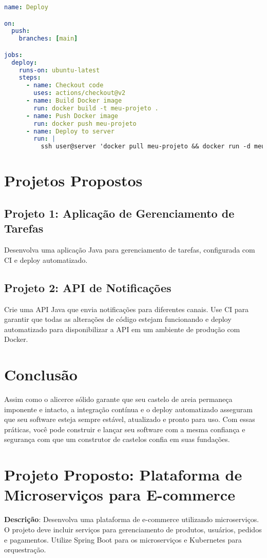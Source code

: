 \documentclass[a4paper,12pt]{book}
\begin{document}
\begin{lstlisting}[language=yaml]
name: Deploy

on:
  push:
    branches: [main]

jobs:
  deploy:
    runs-on: ubuntu-latest
    steps:
      - name: Checkout code
        uses: actions/checkout@v2
      - name: Build Docker image
        run: docker build -t meu-projeto .
      - name: Push Docker image
        run: docker push meu-projeto
      - name: Deploy to server
        run: |
          ssh user@server 'docker pull meu-projeto && docker run -d meu-projeto'
\end{lstlisting}

\section{Projetos Propostos}
\subsection{Projeto 1: Aplicação de Gerenciamento de Tarefas}
Desenvolva uma aplicação Java para gerenciamento de tarefas, configurada com CI e deploy automatizado.

\subsection{Projeto 2: API de Notificações}
Crie uma API Java que envia notificações para diferentes canais. Use CI para garantir que todas as alterações de código estejam funcionando e deploy automatizado para disponibilizar a API em um ambiente de produção com Docker.

\section{Conclusão}
Assim como o alicerce sólido garante que seu castelo de areia permaneça imponente e intacto, a integração contínua e o deploy automatizado asseguram que seu software esteja sempre estável, atualizado e pronto para uso. Com essas práticas, você pode construir e lançar seu software com a mesma confiança e segurança com que um construtor de castelos confia em suas fundações.

\section{Projeto Proposto: Plataforma de Microserviços para E-commerce}

\textbf{Descrição}: Desenvolva uma plataforma de e-commerce utilizando microserviços. O projeto deve incluir serviços para gerenciamento de produtos, usuários, pedidos e pagamentos. Utilize Spring Boot para os microserviços e Kubernetes para orquestração.
\end{document}
